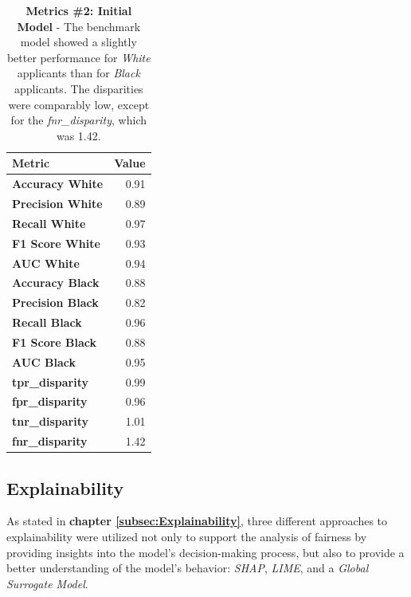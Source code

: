 \begin{table}[!htbp]
    \centering
    \begin{tabular}{lr}
    \toprule
    \textbf{Metric} & \textbf{Value} \\
    \midrule
    \textbf{Accuracy White} & 0.91 \\
    \textbf{Precision White} & 0.89 \\
    \textbf{Recall White} & 0.97 \\
    \textbf{F1 Score White} & 0.93 \\
    \textbf{AUC White} & 0.94 \\
    \midrule
    \textbf{Accuracy Black} & 0.88 \\
    \textbf{Precision Black} & 0.82 \\
    \textbf{Recall Black} & 0.96 \\
    \textbf{F1 Score Black} & 0.88 \\
    \textbf{AUC Black} & 0.95 \\
    \midrule
    \textbf{tpr\_disparity} & 0.99 \\
    \textbf{fpr\_disparity} & 0.96 \\
    \textbf{tnr\_disparity} & 1.01 \\
    \textbf{fnr\_disparity} & 1.42 \\
    \bottomrule
    \end{tabular}
    \medskip
    \caption[Metrics \#2: Initial Model]{\textbf{Metrics \#2: Initial Model} - The benchmark model showed a slightly better performance for \textit{White} applicants than for \textit{Black} applicants. The disparities were comparably low, except for the \textit{fnr\_disparity}, which was 1.42.}
    \label{tab:Fairness_Assessment_Initial}
\end{table}

\subsection{Explainability}\label{Explainability Results}

As stated in \textbf{chapter \ref{subsec:Explainability}}, three different approaches to explainability were utilized not only to support the analysis of fairness by providing insights into the model's decision-making process, but also to provide a better understanding of the model's behavior: \textit{SHAP}, \textit{LIME}, and a \textit{Global Surrogate Model}. 

